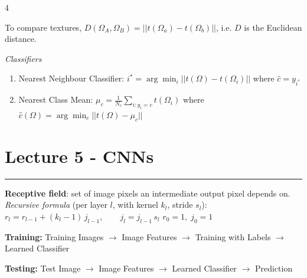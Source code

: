 \documentclass[10pt]{extarticle}
\newcommand{\sectionrule}{\vspace{-2pt}\hrule\vspace{2pt}}
\begin{document}
\begin{multicols}{4}
\begin{formulabox}
    To compare textures, $D(\Omega_A, \Omega_B) = ||t(\Omega_a) - t(\Omega_b)||$, i.e. $D$ is the Euclidean distance.
\end{formulabox}

\textit{Classifiers}
\begin{enumerate}
    \item Nearest Neighbour Classifier: $i^* = \arg\min_i ||t(\Omega)-t(\Omega_i)||$ where $\hat{c} = y_{i^*}$
    \item Nearest Class Mean: $\mu_c = \tfrac{1}{N_c}\sum_{i:y_i=c} t(\Omega_i)$ where $\hat{c}(\Omega) = \arg\min_c ||t(\Omega)-\mu_c||$
\end{enumerate}

{\centering
{}\par}

\section*{Lecture 5 - CNNs}
\sectionrule
\textbf{Receptive field}: set of image pixels an intermediate output pixel depends on. \\
\textit{Recursive formula} (per layer $l$, with kernel $k_l$, stride $s_l$):
$r_l = r_{l-1} + (k_l - 1)\, j_{l-1}, \qquad j_l = j_{l-1}\, s_l$
 $r_0 = 1,\; j_0 = 1$

\textbf{Training:} \quad \colorbox{red!10}{Training Images} $\rightarrow$ Image Features $\rightarrow$ Training with Labels $\rightarrow$ Learned Classifier

\textbf{Testing:} \quad Test Image $\rightarrow$ Image Features $\rightarrow$ Learned Classifier $\rightarrow$ Prediction


\end{multicols}
\end{document}
